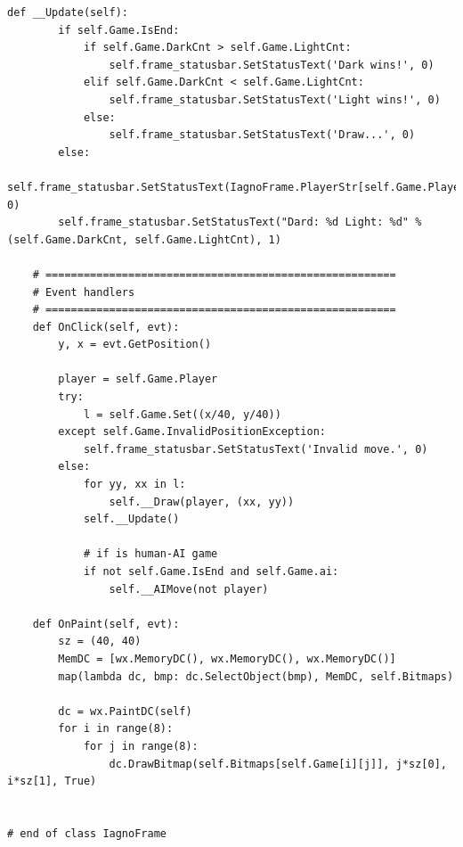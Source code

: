 \documentclass[oneside,a4paper]{article}
\begin{document}
\begin{lstlisting}[caption={frame.py}]
    def __Update(self):
        if self.Game.IsEnd:
            if self.Game.DarkCnt > self.Game.LightCnt:
                self.frame_statusbar.SetStatusText('Dark wins!', 0)
            elif self.Game.DarkCnt < self.Game.LightCnt:
                self.frame_statusbar.SetStatusText('Light wins!', 0)
            else:
                self.frame_statusbar.SetStatusText('Draw...', 0)
        else:
            self.frame_statusbar.SetStatusText(IagnoFrame.PlayerStr[self.Game.Player], 0)
        self.frame_statusbar.SetStatusText("Dard: %d Light: %d" % (self.Game.DarkCnt, self.Game.LightCnt), 1)

    # =======================================================
    # Event handlers
    # =======================================================
    def OnClick(self, evt):
        y, x = evt.GetPosition()

        player = self.Game.Player
        try:
            l = self.Game.Set((x/40, y/40))
        except self.Game.InvalidPositionException:
            self.frame_statusbar.SetStatusText('Invalid move.', 0)
        else:
            for yy, xx in l:
                self.__Draw(player, (xx, yy))
            self.__Update()

            # if is human-AI game
            if not self.Game.IsEnd and self.Game.ai:
                self.__AIMove(not player)

    def OnPaint(self, evt):
        sz = (40, 40)
        MemDC = [wx.MemoryDC(), wx.MemoryDC(), wx.MemoryDC()]
        map(lambda dc, bmp: dc.SelectObject(bmp), MemDC, self.Bitmaps)

        dc = wx.PaintDC(self)
        for i in range(8):
            for j in range(8):
                dc.DrawBitmap(self.Bitmaps[self.Game[i][j]], j*sz[0], i*sz[1], True)
                

# end of class IagnoFrame
\end{lstlisting}
\end{document}
